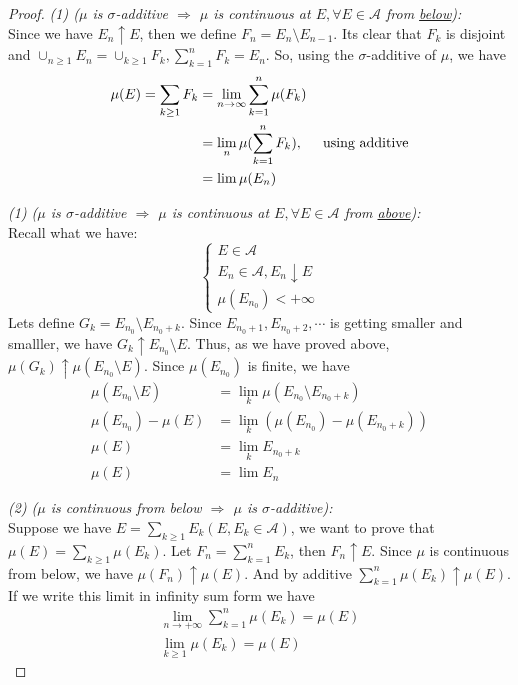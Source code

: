 \begin{proof}
  \emph{(1) ($\mu$ is $\sigma$-additive $\Rightarrow$ $\mu$ is continuous at $E, \forall E\in\mathcal{A}$ from \underline{below}):} \\
  Since we have $E_n\uparrow E$, then we define $F_n = E_n\setminus E_{n-1}$.
  Its clear that $F_k$ is disjoint and $\cup_{n\geq 1} E_n = \cup_{k\geq 1} F_k, \sum_{k=1}^n F_k = E_n$.
  So, using the $\sigma$-additive of $\mu$, we have
  \begin{align*}
    \mu(E) = \sum_{k\geq 1} F_k &= \lim_{n\to\infty} \sum_{k=1}^n \mu(F_k) \\
    &= \lim_n \mu(\sum_{k=1}^n F_k), \hspace{0.5cm} \mbox{using additive} \\
    &= \lim \mu(E_n)
  \end{align*}

  \emph{(1) ($\mu$ is $\sigma$-additive $\Rightarrow$ $\mu$ is continuous at $E, \forall E\in\mathcal{A}$ from \underline{above}):} \\
  Recall what we have: \[
    \left\{
      \begin{array}{l}
        E\in\mathcal{A} \\
        E_n \in \mathcal{A}, E_n\downarrow E \\
        \mu(E_{n_0}) < +\infty
      \end{array}
    \right.
  \]
  Lets define $G_k = E_{n_0}\setminus E_{n_0+k}$.
  Since $E_{n_0+1}, E_{n_0+2}, \cdots$ is getting smaller and smalller,
  we have $G_k\uparrow E_{n_0} \setminus E$.
  Thus, as we have proved above, $\mu(G_k)\uparrow \mu(E_{n_0}\setminus E)$.
  Since $\mu(E_{n_0})$ is finite, we have 
  \begin{align*}
    \mu(E_{n_0}\setminus E) &= \lim_k \mu(E_{n_0}\setminus E_{n_0+k}) \\
    \mu(E_{n_0}) - \mu(E) &= \lim_k (\mu(E_{n_0}) - \mu(E_{n_0+k})) \\
    \mu(E) &= \lim_k E_{n_0+k} \\
    \mu(E) &= \lim E_n
  \end{align*}

  \emph{(2) ($\mu$ is continuous from below $\Rightarrow$ $\mu$ is $\sigma$-additive):} \\
  Suppose we have $E = \sum_{k\geq 1} E_k (E, E_k\in\mathcal{A})$, we want to prove that $\mu(E) = \sum_{k\geq 1} \mu(E_k)$.
  Let $F_n = \sum_{k=1}^n E_k$, then $F_n \uparrow E$.
  Since $\mu$ is continuous from below, we have $\mu(F_n)\uparrow \mu(E)$.
  And by additive $\sum_{k=1}^n \mu(E_k) \uparrow \mu(E)$.
  If we write this limit in infinity sum form we have
  \begin{align*}
    \lim_{n\to+\infty}\sum_{k=1}^n \mu(E_k) = \mu(E) \\
    \lim_{k\geq 1} \mu(E_k) = \mu(E)
  \end{align*}


\end{proof}

